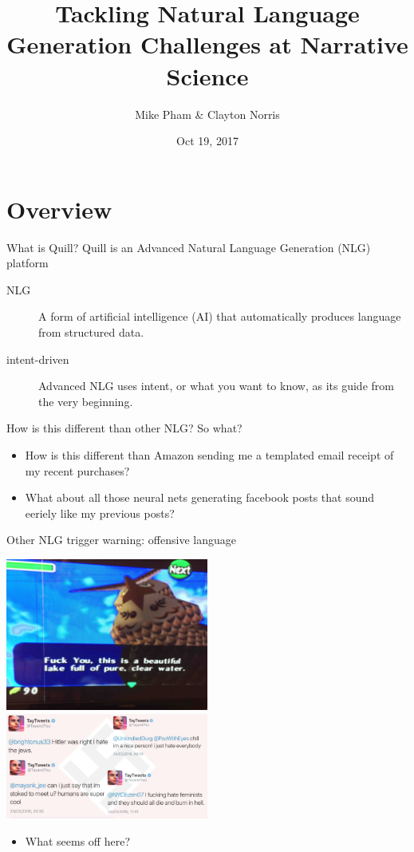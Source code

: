 \documentclass[10pt, compress]{beamer}
\title{Tackling Natural Language Generation Challenges at Narrative Science}
\subtitle{}
\date{Oct 19, 2017}
\author{Mike Pham \& Clayton Norris}
\institute{Narrative Science}
\begin{document}
\maketitle

\section{Overview}
\begin{frame}{What is Quill?}
    Quill is an \alert{Advanced Natural Language Generation (NLG)} platform

    \begin{description}
        \item[NLG] A form of artificial intelligence (AI) that automatically produces language from structured data. 
        \item[intent-driven] Advanced NLG uses \alert{intent}, or what you want to know, as its guide from the very beginning.
    \end{description}
\end{frame}

\begin{frame}{How is this different than other NLG?}
	So what?
	\pause

	\begin{itemize}
		\item How is this different than Amazon sending me a templated email receipt of my recent purchases?	\pause
		\item What about all those neural nets generating facebook posts that sound eeriely like my previous posts?	\pause
	\end{itemize}
\end{frame}

\begin{frame}{Other NLG}
	\alert{trigger warning: offensive language}
	\pause
	\begin{multicols}{2}
		\includegraphics[width=0.5\textwidth]{images/zelda.jpg}
		\includegraphics[width=0.5\textwidth]{images/tay.png}
	\end{multicols}
	
	\pause
	
	\begin{itemize}
		\item What seems off here?
	\end{itemize}
\end{frame}
\end{document}
